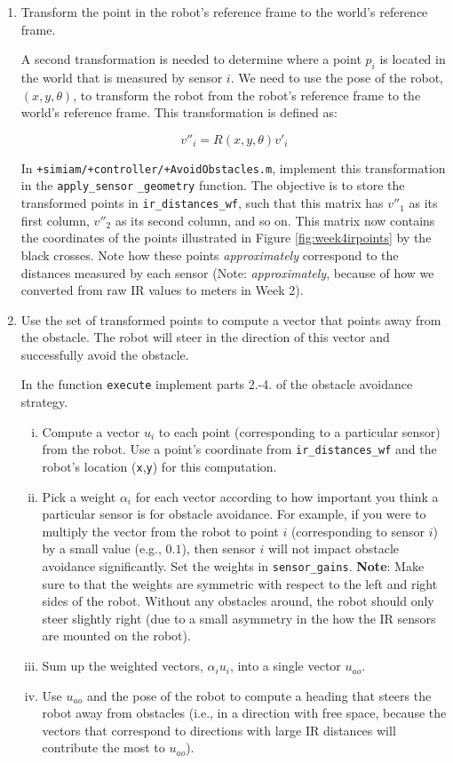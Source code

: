 \documentclass[10pt]{article}
\begin{document}
\begin{enumerate}
  \item Transform the point in the robot's reference frame to the world's reference frame.
  
  A second transformation is needed to determine where a point $p_i$ is located in the world that is measured by sensor $i$. We need to use the pose of the robot, $(x,y,\theta)$, to transform the robot from the robot's reference frame to the world's reference frame. This transformation is defined as:
  
  \begin{equation*}
    v''_i = R(x,y,\theta)v'_i
  \end{equation*}
  
  In \texttt{+simiam/+controller/+AvoidObstacles.m}, implement this transformation in the \texttt{apply\_sensor} \texttt{\_geometry} function. The objective is to store the transformed points in \texttt{ir\_distances\_wf}, such that this matrix has $v''_1$ as its first column, $v''_2$ as its second column, and so on. This matrix now contains the coordinates of the points illustrated in Figure \ref{fig:week4irpoints} by the black crosses. Note how these points \textit{approximately} correspond to the distances measured by each sensor (Note: \textit{approximately}, because of how we converted from raw IR values to meters in Week 2).
  
  \item Use the set of transformed points to compute a vector that points away from the obstacle. The robot will steer in the direction of this vector and successfully avoid the obstacle.
  
  In the function \texttt{execute} implement parts 2.-4. of the obstacle avoidance strategy.
  \begin{enumerate}[(i)]
    \item Compute a vector $u_i$ to each point (corresponding to a particular sensor) from the robot. Use a point's coordinate from \texttt{ir\_distances\_wf} and the robot's location (\texttt{x},\texttt{y}) for this computation.
    \item Pick a weight $\alpha_i$ for each vector according to how important you think a particular sensor is for obstacle avoidance. For example, if you were to multiply the vector from the robot to point $i$ (corresponding to sensor $i$) by a small value (e.g., $0.1$), then sensor $i$ will not impact obstacle avoidance significantly. Set the weights in \texttt{sensor\_gains}. \textbf{Note}: Make sure to that the weights are symmetric with respect to the left and right sides of the robot. Without any obstacles around, the robot should only steer slightly right (due to a small asymmetry in the how the IR sensors are mounted on the robot).
    \item Sum up the weighted vectors, $\alpha_iu_i$, into a single vector $u_{ao}$.
    \item Use $u_{ao}$ and the pose of the robot to compute a heading that steers the robot away from obstacles (i.e., in a direction with free space, because the vectors that correspond to directions with large IR distances will contribute the most to $u_{ao}$).    
  \end{enumerate} 
\end{enumerate}
\end{document}

